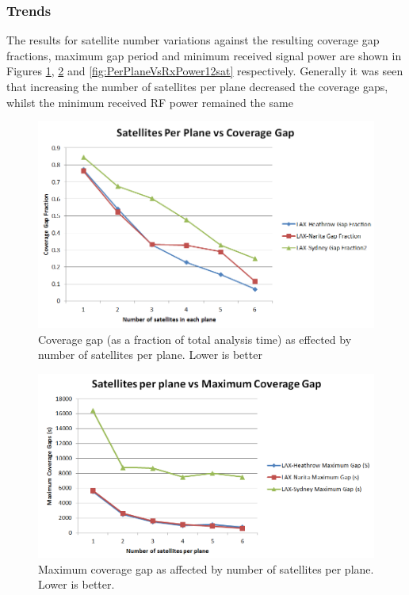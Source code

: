 \subsubsection{Trends}
The results for satellite number variations against the resulting coverage gap fractions, maximum gap period and minimum received signal power are shown in Figures \ref{fig:PerPlaneVsCovGap12sat}, \ref{fig:PerPlaneVsMaxGap12sat} and \ref{fig:PerPlaneVsRxPower12sat} respectively. Generally it was seen that increasing the number of satellites per plane decreased the coverage gaps, whilst the minimum received RF power remained the same
\begin{figure}[H]
	\centering
	\includegraphics[scale = 0.6]{Pictures/PerPlaneVsCovGap12sat.png}
	
	\caption{Coverage gap (as a fraction of total analysis time) as effected by number of satellites per plane. Lower is better}
	\label{fig:PerPlaneVsCovGap12sat}
\end{figure} 

\begin{figure}[H]
	\centering
	\includegraphics[scale = 0.6]{Pictures/PerPlaneVsMaxGap12sat.png}
	
	\caption{Maximum coverage gap as affected by number of satellites per plane. Lower is better.}
	\label{fig:PerPlaneVsMaxGap12sat}
\end{figure} 

